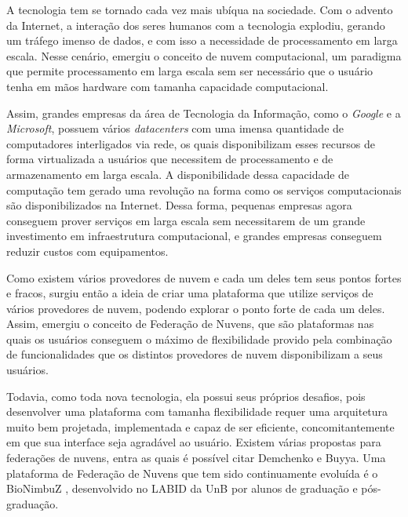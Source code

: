 A tecnologia tem se tornado cada vez mais ubíqua na sociedade. Com o advento da Internet, a interação dos seres humanos com a tecnologia explodiu, gerando um tráfego imenso de dados, e com isso a necessidade de processamento em larga escala. Nesse cenário, emergiu o conceito de nuvem computacional, um paradigma que permite processamento em larga escala sem ser necessário que o usuário tenha em mãos hardware com tamanha capacidade computacional.

Assim, grandes empresas da área de Tecnologia da Informação, como o \textit{Google}\cite{Google} e a \textit{Microsoft}\cite{Microsoft}, possuem vários \textit{datacenters} com uma imensa quantidade de computadores interligados via rede, os quais disponibilizam esses recursos de forma virtualizada a usuários que necessitem de processamento e de armazenamento em larga escala. A disponibilidade dessa capacidade de computação tem gerado uma revolução na forma como os serviços computacionais são disponibilizados na Internet.
Dessa forma, pequenas empresas agora conseguem prover serviços em larga escala sem necessitarem de um grande investimento em infraestrutura computacional, e grandes empresas conseguem reduzir custos com equipamentos.\cite{WhatIsCloudComputing}

Como existem vários provedores de nuvem e cada um deles tem seus pontos fortes e fracos, surgiu então a ideia de criar uma plataforma que utilize serviços de vários provedores de nuvem, podendo explorar o ponto forte de cada um deles. Assim, emergiu o conceito de Federação de Nuvens\cite{6427607}, que são plataformas nas quais os usuários conseguem o máximo de flexibilidade provido pela combinação de funcionalidades que os distintos provedores de nuvem disponibilizam a seus usuários.

Todavia, como toda nova tecnologia, ela possui seus próprios desafios, pois desenvolver uma plataforma com tamanha flexibilidade requer uma arquitetura muito bem projetada, implementada e capaz de ser eficiente, concomitantemente em que sua interface seja agradável ao usuário. Existem várias propostas para federações de nuvens, entra as quais é possível citar Demchenko\cite{6427607} e Buyya\cite{Buyya:2010:IUF:2143583.2143586}. Uma plataforma de Federação de Nuvens que tem sido continuamente evoluída é o BioNimbuZ \cite{BioNimbuZ_Breno_Deric} \cite{BioNimbuZ_Closer} \cite{BioNimbuZ_6846526} \cite{Saldanha2012} \cite{6732620_BioNimbuZ_ACOsched} \cite{BioNimbuZ_Willian_C99} \cite{closer12_BioNimbuZ_AHP} \cite{Saldanha_BioNimbus}, desenvolvido no \acrfull{LABID} da \acrfull{UnB} por alunos de graduação e pós-graduação.

